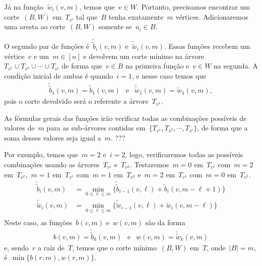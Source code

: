 \begin{itemize}
	Já na função~$\tilde{w}_i(v,m)$, temos que~${v\in W}$.
	Portanto, precisamos encontrar 
	um corte~$(B,W)$ em~$T_{v^i}$ 
	tal que~$B$ tenha exatamente~$m$ vértices.
	Adicionaremos uma aresta ao corte~$(B,W)$ somente
	se~$u_i\in B$.

	\bigskip

	O segundo par de funções é~$\tilde{\tilde{b}}_i(v,m)$
	e~$\tilde{\tilde{w}}_i(v,m)$.
	Essas funções recebem um vértice~$v$ e um~$m\in [n]$ e
	devolvem um corte mínimo na 
	árvore~${T_{v^1}\cup T_{v^2}\cup \cdots \cup T_{v^i}}$
	de forma que~${v\in B}$ na primeira função
	e~${v\in W}$ na segunda.
	A condição inicial de ambas é quando~$i=1$, e nesse caso
	temos que 
	\begin{align*}
		\tilde{\tilde{b}}_1(v,m) =  \tilde{b}_1(v,m)\ \ \text{ e }\ \
		\tilde{\tilde{w}}_1(v,m) =  \tilde{w}_1(v,m), \nonumber
	\end{align*}
	pois o corte devolvido será o referente a árvore~$T_{v^1}$.

	As fórmulas gerais das funções irão verificar todas as 
	combinações possíveis de valores de~$m$ para as sub-árvores 
	contidas em~$\{ T_{v^1},T_{v^2},\cdots,T_{v^i} \}$, de forma
	que a soma desses valores seja igual a~$m$. ???
	
	Por exemplo, temos que~$m = 2$ e~$i=2$, logo, 
	verificaremos todas as possíveis combinações usando
	as árvores~$T_{v^1}$ e~$T_{v^2}$.
	Testaremos~$m=0$ em~$T_{v^1}$ com~$m=2$ em~$T_{v^2}$,~$m=1$ 
	em~$T_{v^1}$ com~$m=1$ em~$T_{v^2}$ 
	e~$m=2$ em~$T_{v^1}$ com~$m=0$ em~$T_{v^2}$.
	\begin{align*}
		\tilde{\tilde{b}}_{i}(v,m) &= 
			\min_{0\le\ell\le m} \{ \tilde{\tilde{b}}_{i-1}(v,\ell) + 
			\tilde{b}_i(v, m-\ell +1) \} \nonumber \\
		\tilde{\tilde{w}}_{i}(v,m) &= 
			\min_{0\le\ell\le m} \{ \tilde{\tilde{w}}_{i-1}(v,\ell) + 
			\tilde{w}_i(v, m-\ell) \} \nonumber \\
	\end{align*}
	Neste caso, as funções~$b(v,m)$ e~$w(v,m)$ são da forma
	\begin{align*}
		b(v,m) = \tilde{\tilde{b}}_k(v,m)\ \ \text{ e }\ \
		w(v,m) = \tilde{\tilde{w}}_k(v,m) \nonumber
	\end{align*}
	e, sendo~$r$ a raíz de~$T$, temos que
	 o corte mínimo~$(B,W)$ em~$T$, onde~${|B|=m}$, 
	é~$\min\{b(r,m), w(r,m)\}$.
\end{itemize}
